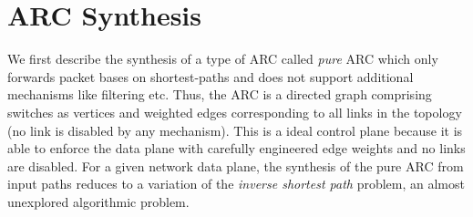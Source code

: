 


\section{ARC Synthesis} \label{sec:synthesis}
We first describe the synthesis of a type of ARC 
called {\em pure} ARC which
only forwards packet bases on shortest-paths and does 
not support additional mechanisms like filtering etc. 
Thus, 
the ARC is a directed graph comprising switches as 
vertices and weighted edges corresponding to all links in the
topology (no link is disabled by any mechanism). 
This is 
a ideal control plane because it is able to enforce the data plane
with carefully engineered edge weights and no links are disabled. 
For a given network data plane, the synthesis of 
the pure ARC from input paths reduces to a
variation of the {\em inverse shortest path} problem, an almost 
unexplored algorithmic problem. 

